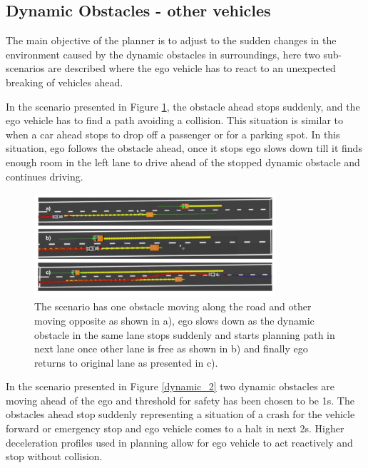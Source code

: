 \subsection{Dynamic Obstacles - other vehicles}
The main objective of the planner is to adjust to the sudden changes in the environment caused by the dynamic obstacles in surroundings, here two sub-scenarios are described where the ego vehicle has to react to an unexpected breaking of vehicles ahead. 

In the scenario presented in Figure \ref{dynamic_1}, the obstacle ahead stops suddenly, and the ego vehicle has to find a path avoiding a collision. This situation is similar to when a car ahead stops to drop off a passenger or for a parking spot. In this situation, ego follows the obstacle ahead, once it stops ego slows down till it finds enough room in the left lane to drive ahead of the stopped dynamic obstacle and continues driving. 

\begin{figure}
    \centering
    \includegraphics[width=0.8\textwidth]{Images/evaluation/sudden_Stop_dyn_1.jpg}
    \caption{The scenario has one obstacle moving along the road and other moving opposite as shown in a), ego slows down as the dynamic obstacle in the same lane stops suddenly and starts planning path in next lane once other lane is free as shown in b) and finally ego returns to original lane as presented in c). }
    \label{dynamic_1}
\end{figure}

In the scenario presented in Figure \ref{dynamic_2} two dynamic obstacles are moving ahead of the ego and threshold for safety has been chosen to be 1s. The obstacles ahead stop suddenly representing a situation of a crash for the vehicle forward or emergency stop and ego vehicle comes to a halt in next 2s. Higher deceleration profiles used in planning allow for ego vehicle to act reactively and stop without collision. 

